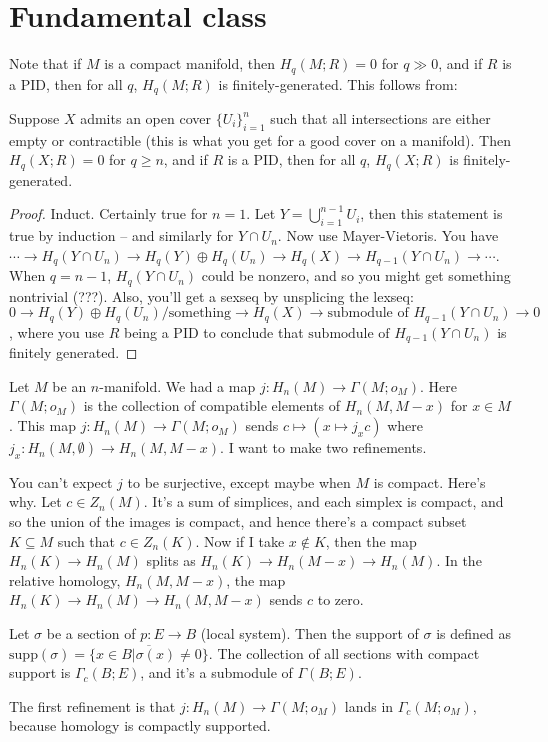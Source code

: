 \section{Fundamental class}
Note that if $M$ is a compact manifold, then $H_q(M;R)=0$ for $q\gg 0$, and if $R$ is a PID, then for all $q$, $H_q(M;R)$ is finitely-generated. This follows from:
\begin{claim}
Suppose $X$ admits an open cover $\{U_i\}_{i=1}^n$ such that all intersections are either empty or contractible (this is what you get for a good cover on a manifold). Then $H_q(X;R)=0$ for $q\geq n$, and if $R$ is a PID, then for all $q$, $H_q(X;R)$ is finitely-generated.
\end{claim}
\begin{proof}
Induct. Certainly true for $n=1$. Let $Y=\bigcup^{n-1}_{i=1}U_i$, then this statement is true by induction -- and similarly for $Y\cap U_n$. Now use Mayer-Vietoris. You have $\cdots\to H_q(Y\cap U_n)\to H_q(Y)\oplus H_q(U_n)\to H_q(X)\to H_{q-1}(Y\cap U_n)\to\cdots$. When $q=n-1$, $H_q(Y\cap U_n)$ could be nonzero, and so you might get something nontrivial (???). Also, you'll get a sexseq by unsplicing the lexseq: $0\to H_q(Y)\oplus H_q(U_n)/\text{something}\to H_q(X)\to \text{submodule of }H_{q-1}(Y\cap U_n)\to 0$, where you use $R$ being a PID to conclude that $\text{submodule of }H_{q-1}(Y\cap U_n)$ is finitely generated.
\end{proof}
Let $M$ be an $n$-manifold. We had a map $j:H_n(M)\to \Gamma(M;o_M)$. Here $\Gamma(M;o_M)$ is the collection of compatible elements of $H_n(M,M-x)$ for $x\in M$. This map $j:H_n(M)\to \Gamma(M;o_M)$ sends $c\mapsto(x\mapsto j_x c)$ where $j_x:H_n(M,\emptyset)\to H_n(M,M-x)$. I want to make two refinements.

You can't expect $j$ to be surjective, except maybe when $M$ is compact. Here's why. Let $c\in Z_n(M)$. It's a sum of simplices, and each simplex is compact, and so the union of the images is compact, and hence there's a compact subset $K\subseteq M$ such that $c\in Z_n(K)$. Now if I take $x\not\in K$, then the map $H_n(K)\to H_n(M)$ splits as $H_n(K)\to H_n(M-x)\to H_n(M)$. In the relative homology, $H_n(M,M-x)$, the map $H_n(K)\to H_n(M)\to H_n(M,M-x)$ sends $c$ to zero.
\begin{definition}
Let $\sigma$ be a section of $p:E\to B$ (local system). Then the support of $\sigma$ is defined as $\mathrm{supp}(\sigma)=\overline{\{x\in B|\sigma(x)\neq 0\}}$. The collection of all sections with compact support is $\Gamma_c(B;E)$, and it's a submodule of $\Gamma(B;E)$.
\end{definition}
The first refinement is that $j:H_n(M)\to \Gamma(M;o_M)$ lands in $\Gamma_c(M;o_M)$, because homology is compactly supported.

